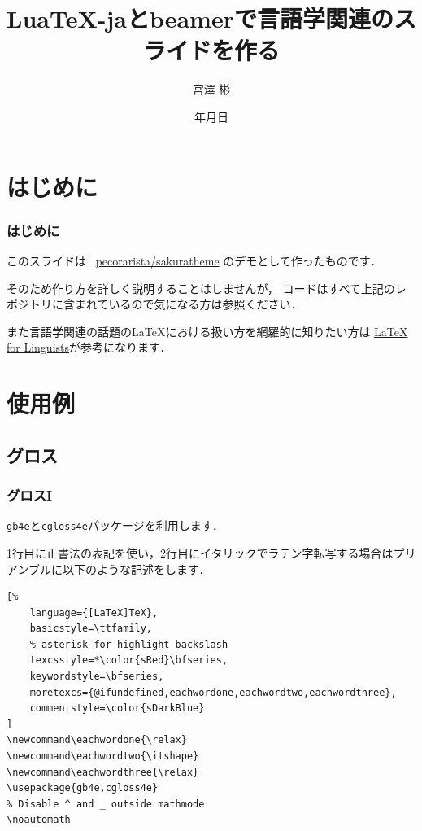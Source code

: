 \documentclass[
    12pt,
    unicode]{beamer}
\title{Lua\TeX{}-jaとbeamerで言語学関連のスライドを作る}
\institute{総合研究大学院大学}
\author{宮澤 彬}
\date{{\number\year}年{\number\month}月{\number\day}日}
\newcommand\eachwordone{\relax}
\newcommand\eachwordtwo{\itshape}
\newcommand\eachwordthree{\relax}
\begin{document}
\begin{frame}
    \maketitle
\end{frame}

\section{はじめに}
\begin{frame}
    \frametitle{はじめに}
    このスライドは \faGithub\ \href{https://github.com/pecorarista/sakuratheme}{\ttfamily pecorarista/sakuratheme}
    のデモとして作ったものです．

    \bigskip

    そのため作り方を詳しく説明することはしませんが，
    コードはすべて上記のレポジトリに含まれているので気になる方は参照ください．
    \bigskip

    また言語学関連の話題の\LaTeX における扱い方を網羅的に知りたい方は
    \href{https://www1.essex.ac.uk/linguistics/external/clmt/latex4ling/}
    {LaTeX for Linguists}が参考になります．
\end{frame}

\section{使用例}
\subsection{グロス}
\begin{frame}[fragile]
\frametitle{グロスI}
\href{https://ctan.org/pkg/gb4e}{\texttt{gb4e}}と\href{https://ctan.org/pkg/gb4e}{\texttt{cgloss4e}}パッケージを利用します．

\bigskip

1行目に正書法の表記を使い，2行目にイタリックでラテン字転写する場合はプリアンブルに以下のような記述をします．
\begin{leftbar}
\begin{lstlisting}[%
    language={[LaTeX]TeX},
    basicstyle=\ttfamily,
    % asterisk for highlight backslash
    texcsstyle=*\color{sRed}\bfseries,
    keywordstyle=\bfseries,
    moretexcs={@ifundefined,eachwordone,eachwordtwo,eachwordthree},
    commentstyle=\color{sDarkBlue}
]
\newcommand\eachwordone{\relax}
\newcommand\eachwordtwo{\itshape}
\newcommand\eachwordthree{\relax}
\usepackage{gb4e,cgloss4e}
% Disable ^ and _ outside mathmode
\noautomath
\end{lstlisting}
\end{leftbar}
\end{frame}
\end{document}
